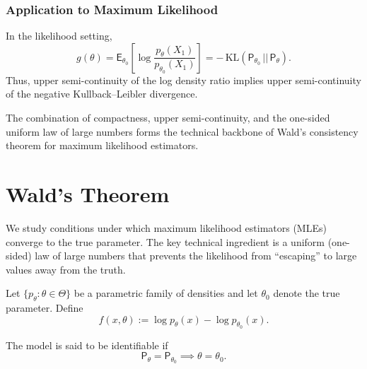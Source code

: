 \subsubsection{Application to Maximum Likelihood}

\begin{remark}
In the likelihood setting,
\begin{equation*}
g(\theta)
=
\mathsf{E}_{\theta_0}\!\left[
\log\frac{p_\theta(X_1)}{p_{\theta_0}(X_1)}
\right]
=
-\,\mathrm{KL}(\mathsf{P}_{\theta_0}\,||\,\mathsf{P}_{\theta}).
\end{equation*}
Thus, upper semi-continuity of the log density ratio implies upper semi-continuity of the negative Kullback--Leibler divergence.
\end{remark}

\begin{note}
The combination of compactness, upper semi-continuity, and the one-sided uniform law of large numbers forms the technical backbone of Wald's consistency theorem for maximum likelihood estimators.
\end{note}


\section{Wald's Theorem}

We study conditions under which maximum likelihood estimators (MLEs) converge to the true parameter. The key technical ingredient is a uniform (one-sided) law of large numbers that prevents the likelihood from ``escaping'' to large values away from the truth.

\begin{definition}
Let $\{p_\theta:\theta\in\Theta\}$ be a parametric family of densities and let $\theta_0$ denote the true parameter. Define
\begin{equation*}
f(x,\theta) := \log p_\theta(x) - \log p_{\theta_0}(x).
\end{equation*}
\end{definition}

\begin{definition}[Identifiability]
\label{def:identifiability}
The model is said to be identifiable if
\begin{equation*}
\mathsf{P}_\theta = \mathsf{P}_{\theta_0} \implies \theta = \theta_0.
\end{equation*}
\end{definition}

